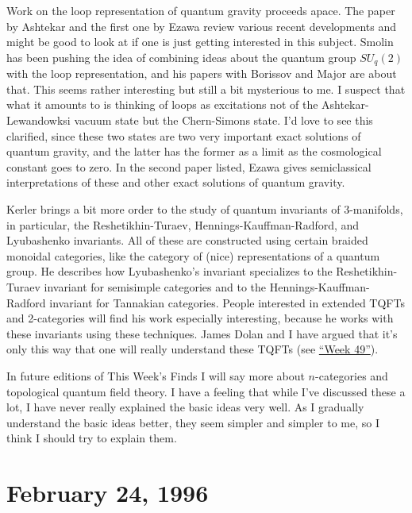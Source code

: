 \documentclass{article}
\def\tightlist{}
\renewcommand{\texttt}[1]{%
  \begingroup
  \ttfamily
  \begingroup\lccode`~=`/\lowercase{\endgroup\def~}{/\discretionary{}{}{}}%
  \begingroup\lccode`~=`[\lowercase{\endgroup\def~}{[\discretionary{}{}{}}%
  \begingroup\lccode`~=`.\lowercase{\endgroup\def~}{.\discretionary{}{}{}}%
  \catcode`/=\active\catcode`[=\active\catcode`.=\active
  \scantokens{#1\noexpand}%
  \endgroup
}
\begin{document}
Work on the loop representation of quantum gravity proceeds apace. The
paper by Ashtekar and the first one by Ezawa review various recent
developments and might be good to look at if one is just getting
interested in this subject. Smolin has been pushing the idea of
combining ideas about the quantum group \(SU_q(2)\) with the loop
representation, and his papers with Borissov and Major are about that.
This seems rather interesting but still a bit mysterious to me. I
suspect that what it amounts to is thinking of loops as excitations not
of the Ashtekar-Lewandowksi vacuum state but the Chern-Simons state. I'd
love to see this clarified, since these two states are two very
important exact solutions of quantum gravity, and the latter has the
former as a limit as the cosmological constant goes to zero. In the
second paper listed, Ezawa gives semiclassical interpretations of these
and other exact solutions of quantum gravity.


Kerler brings a bit more order to the study of quantum invariants of
3-manifolds, in particular, the Reshetikhin-Turaev,
Hennings-Kauffman-Radford, and Lyubashenko invariants. All of these are
constructed using certain braided monoidal categories, like the category
of (nice) representations of a quantum group. He describes how
Lyubashenko's invariant specializes to the Reshetikhin-Turaev invariant
for semisimple categories and to the Hennings-Kauffman-Radford invariant
for Tannakian categories. People interested in extended TQFTs and
2-categories will find his work especially interesting, because he works
with these invariants using these techniques. James Dolan and I have
argued that it's only this way that one will really understand these
TQFTs (see \protect\hyperlink{week49}{``Week 49''}).

In future editions of This Week's Finds I will say more about
\(n\)-categories and topological quantum field theory. I have a feeling
that while I've discussed these a lot, I have never really explained the
basic ideas very well. As I gradually understand the basic ideas better,
they seem simpler and simpler to me, so I think I should try to explain
them.
\hypertarget{week73}{%
\section{February 24, 1996}\label{week73}}
\end{document}
